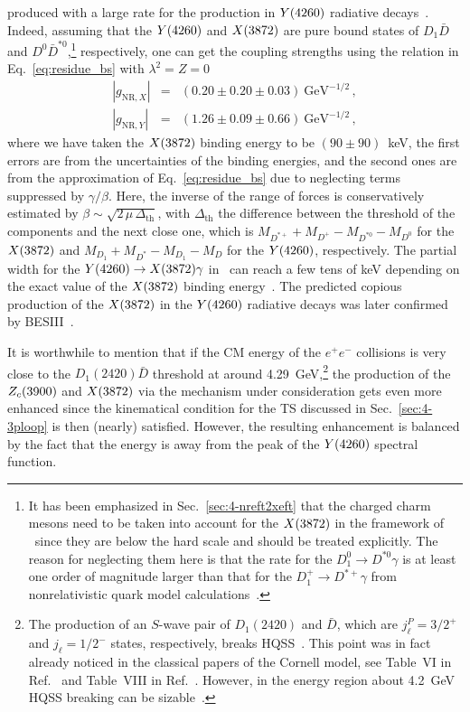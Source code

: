 produced with a large rate for the production
 in $Y(4260)$ radiative decays~\cite{Guo:2013nza}.
 Indeed, assuming that the $Y(4260)$ and
$X(3872)$ are pure bound states of $D_1\bar D$ and $D^0\bar D^{*0}$,\footnote{It has
been emphasized in
Sec.~\ref{sec:4-nreft2xeft} that the charged charm mesons need to be taken
into account for the $X(3872)$ in the framework of \nreft~since they are below the
hard scale and should be treated explicitly. The reason for neglecting them here
is that the rate for the $D_1^0\to D^{*0}\gamma$ is at least one
order of magnitude larger than that for the $D_1^+\to D^{*+}\gamma$ from
nonrelativistic quark model
calculations~\cite{Fayyazuddin:1994qu,Godfrey:2005ww,Close:2005se}.}
respectively,
one can get the coupling strengths using the relation in
Eq.~\eqref{eq:residue_bs} with $\lambda^2=Z=0$
\begin{eqnarray}
  |g_{\text{NR},X}^{}| &=& (0.20\pm0.20\pm0.03)~\text{GeV}^{-1/2} \,,
  \nonumber\\ |g_{\text{NR},Y}^{}| &=&
(1.26\pm0.09\pm0.66)~\text{GeV}^{-1/2} \,,
\end{eqnarray}
where we have taken the $X(3872)$ binding energy to be $(90\pm90)$~keV, the first
errors are from the uncertainties of the binding energies, and
the second ones are from the approximation of Eq.~\eqref{eq:residue_bs}
due to neglecting terms suppressed by $\gamma/\beta$. Here, the inverse of the
range of forces is conservatively estimated by $\beta\sim \sqrt{2\, \mu\,
\Delta_\text{th}}$, with $ \Delta_\text{th}$ the difference
between the threshold of the components and the next close one, which is
$M_{D^{*+}} + M_{ D^+ } - M_{D^{*0}} - M_{ D^0 }$ for the $X(3872)$ and $M_{D_1} +
M_{ D^* } - M_{D_1} - M_{ D }$ for the $Y(4260)$, respectively.
The partial width for the $Y(4260)\to X(3872)\gamma$ in \nreft~can
reach a few tens of keV depending on the exact value of the $X(3872)$ binding
energy~\cite{Guo:2013nza}.
The predicted copious production of the $X(3872)$ in the $Y(4260)$ radiative decays
was later confirmed by BESIII~\cite{Ablikim:2013dyn}.


It is worthwhile to mention that if the CM energy of the $e^+e^-$ collisions is
very close to the $D_1(2420)\bar D$ threshold at around 4.29~GeV,\footnote{The
production of an $S$-wave pair of $D_1(2420)$ and $\bar D$, which are
$j_\ell^P=3/2^+$ and $j_\ell=1/2^-$ states, respectively, breaks
HQSS~\cite{Li:2013yka}. This point was in fact already noticed in the classical
papers of the Cornell model, see Table~VI in Ref.~\cite{Eichten:1978tg} and
Table~VIII in Ref.~\cite{Eichten:1979ms}. However, in the energy region about
4.2~GeV HQSS breaking can be sizable~\cite{Wang:2013kra}.} the production of the
$Z_c(3900)$ and $X(3872)$ via the mechanism under consideration gets even more enhanced
since the kinematical condition for the TS discussed in Sec.~\ref{sec:4-3ploop}
is then (nearly) satisfied.
However, the resulting enhancement is balanced by the fact that the energy is
away from the peak of the $Y(4260)$ spectral function.

